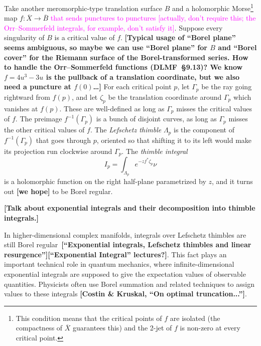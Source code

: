 \documentclass{article}
\newcommand{\maps}{\colon}
\begin{document}
\begin{itemize}
Take another meromorphic-type translation surface $B$ and a holomorphic Morse\footnote{This condition means that the critical points of $f$ are isolated (the compactness of $\overline{X}$ guarantees this) and the 2-jet of $f$ is non-zero at every critical point.} map $f \maps \overline{X} \to \overline{B}$ \textcolor{magenta}{that sends punctures to punctures [actually, don't require this; the Orr--Sommerfeld integrals, for example, don't satisfy it]}. Suppose every singularity of $B$ is a critical value of $f$. \textbf{[Typical usage of ``Borel plane'' seems ambiguous, so maybe we can use ``Borel plane'' for $B$ and ``Borel cover'' for the Riemann surface of the Borel-transformed series. How to handle the Orr–Sommerfeld functions (DLMF~\S 9.13)? We know $f = 4u^3 - 3u$ is the pullback of a translation coordinate, but we also need a puncture at $f(0)$\ldots]} For each critical point $p$, let $\Gamma_p$ be the ray going rightward from $f(p)$, and let $\zeta_p$ be the translation coordinate around $\Gamma_p$ which vanishes at $f(p)$. These are well-defined as long as $\Gamma_p$ misses the critical values of $f$. The preimage $f^{-1}(\Gamma_p)$ is a bunch of disjoint curves, as long as $\Gamma_p$ misses the other critical values of $f$. The {\em Lefschetz thimble} $\Lambda_p$ is the component of $f^{-1}(\Gamma_p)$ that goes through $p$, oriented so that shifting it to its left would make its projection run clockwise around $\Gamma_p$. The {\em thimble integral}
\[ I_p = \int_{\Lambda_p} e^{-z f^*\zeta_p} \nu \]
is a holomorphic function on the right half-plane parametrized by $z$, and it turns out \textbf{[we hope]} to be Borel regular.

\textbf{[Talk about exponential integrals and their decomposition into thimble integrals.]}

In higher-dimensional complex manifolds, integrals over Lefschetz thimbles are still Borel regular~\textbf{[``Exponential integrals, Lefschetz thimbles and linear resurgence''][``Exponential Integral'' lectures?]}. This fact plays an important technical role in quantum mechanics, where infinite-dimensional exponential integrals are supposed to give the expectation values of observable quantities. Physicists often use Borel summation and related techniques to assign values to these integrals \textbf{[Costin \& Kruskal, ``On optimal truncation...'']}.


\end{itemize}
\end{document}
